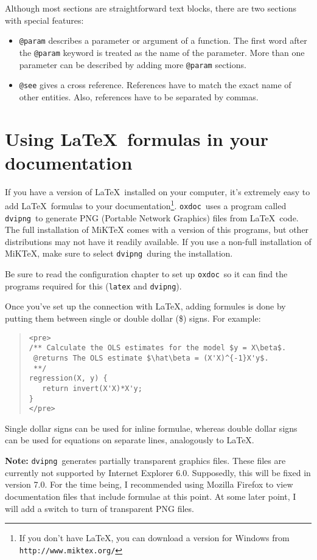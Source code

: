 \documentclass{article}
\newcommand\oxdoc{{\tt oxdoc}}
\newcommand\dvipng{{\tt dvipng}}
\begin{document}
Although most sections are straightforward text blocks, there are two sections with special features:
\begin{itemize}
\item {\tt @param} describes a parameter or argument of a function. The 
first word after the {\tt @param} keyword is treated as the name of the 
parameter. More than one parameter can be described by adding more {\tt @param} sections.
\item {\tt @see} gives a cross reference. References have to 
match the exact name of other entities. Also, references have to be
separated by commas.
\end{itemize}


\section{Using \LaTeX~formulas in your documentation}
If you have a version of \LaTeX~installed on your computer, it's
extremely easy to add \LaTeX~formulas to your documentation\footnote{If you don't
have \LaTeX, you can download a version for Windows from 
{\tt http://www.miktex.org/}}.
\oxdoc~uses a program called \dvipng~to generate PNG (Portable Network
Graphics) files from \LaTeX~code.  The full installation of MiKTeX comes with a version
of this programs, but other distributions may not have it readily available.  If you
use a non-full installation of MiKTeX, make sure to select \dvipng~during the
installation.

Be sure to read the configuration chapter
to set up \oxdoc~so it can find the programs required for 
this ({\tt latex} and \dvipng).

Once you've set up the connection with \LaTeX, adding formules is done
by putting them between single or double dollar (\$) signs. For example:
\begin{quote}
\begin{verbatim}
<pre>
/** Calculate the OLS estimates for the model $y = X\beta$.
 @returns The OLS estimate $\hat\beta = (X'X)^{-1}X'y$.
 **/
regression(X, y) {
   return invert(X'X)*X'y;
}
</pre>
\end{verbatim}
\end{quote}

Single dollar signs can be used for inline formulae, whereas double dollar signs
can be used for equations on separate lines, analogously to \LaTeX.

\textbf{Note:} \dvipng~generates partially transparent graphics files.  These files are
currently not supported by Internet Explorer 6.0. Supposedly, this will be fixed in version 7.0.
For the time being, I recommended using Mozilla Firefox
to view documentation files that include formulae at this point. At some later point, I will add a
switch to turn of transparent PNG files.
\end{document}
